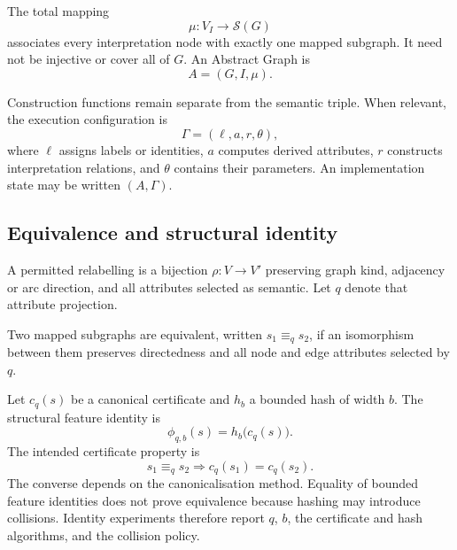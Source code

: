 \begin{definition}
The total mapping
\begin{equation}
  \mu:V_I\longrightarrow\mathcal{S}(G)
\end{equation}
associates every interpretation node with exactly one mapped subgraph. It need
not be injective or cover all of \(G\). An Abstract Graph is
\begin{equation}
  A=(G,I,\mu).
\end{equation}
\end{definition}

Construction functions remain separate from the semantic triple. When
relevant, the execution configuration is
\begin{equation}
  \Gamma=(\ell,a,r,\theta),
\end{equation}
where \(\ell\) assigns labels or identities, \(a\) computes derived
attributes, \(r\) constructs interpretation relations, and \(\theta\) contains
their parameters. An implementation state may be written \((A,\Gamma)\).

\subsection{Equivalence and structural identity}

A permitted relabelling is a bijection \(\rho:V\to V'\) preserving graph kind,
adjacency or arc direction, and all attributes selected as semantic. Let \(q\)
denote that attribute projection.

\begin{definition}
Two mapped subgraphs are equivalent, written \(s_1\equiv_q s_2\), if an
isomorphism between them preserves directedness and all node and edge
attributes selected by \(q\).
\end{definition}

Let \(c_q(s)\) be a canonical certificate and \(h_b\) a bounded hash of width
\(b\). The structural feature identity is
\begin{equation}
  \phi_{q,b}(s)=h_b\bigl(c_q(s)\bigr).
\end{equation}
The intended certificate property is
\begin{equation}
  s_1\equiv_q s_2 \Longrightarrow c_q(s_1)=c_q(s_2).
\end{equation}
The converse depends on the canonicalisation method. Equality of bounded
feature identities does not prove equivalence because hashing may introduce
collisions. Identity experiments therefore report \(q\), \(b\), the
certificate and hash algorithms, and the collision policy.

